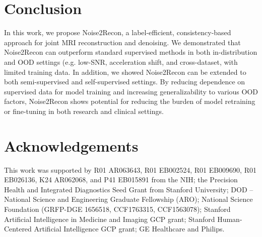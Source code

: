 \documentclass[10pt,twocolumn,letterpaper]{article}
\newcommand{\RV}[1]{{#1}}
\begin{document}
\section{Conclusion}
In this work, we propose Noise2Recon, a label-efficient, consistency-based approach for joint MRI reconstruction and denoising. We demonstrated that Noise2Recon can outperform standard supervised methods in both in-distribution and \RV{OOD settings (e.g. low-SNR, acceleration shift, and cross-dataset}, with limited training data. \RV{In addition, we showed Noise2Recon can be extended to both semi-supervised and self-supervised settings}. By reducing dependence on supervised data for model training and increasing generalizability to various OOD factors, Noise2Recon shows potential for reducing the burden of model retraining or fine-tuning in both research and clinical settings.

\section{Acknowledgements}
This work was supported by R01 AR063643, R01 EB002524, R01 EB009690, R01 EB026136, K24 AR062068, and P41 EB015891 from the NIH; the Precision Health and Integrated Diagnostics Seed Grant from Stanford University; DOD – National Science and Engineering Graduate Fellowship (ARO); National Science Foundation (GRFP-DGE 1656518, CCF1763315, CCF1563078); Stanford Artificial Intelligence in Medicine and Imaging GCP grant; Stanford Human-Centered Artificial Intelligence GCP grant; GE Healthcare and Philips.







\clearpage
\end{document}
